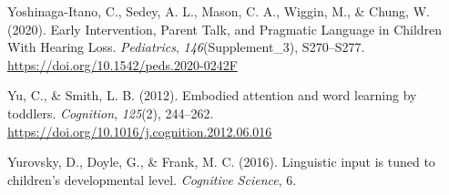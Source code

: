 \documentclass[
  man,floatsintext]{apa6}
\newlength{\cslhangindent}
\newlength{\cslentryspacingunit} %
\newenvironment{CSLReferences}[2] %
 {%
  \setlength{\parindent}{0pt}
  \ifodd #1
  \let\oldpar\par
  \def\par{\hangindent=\cslhangindent\oldpar}
  \fi
  \setlength{\parskip}{#2\cslentryspacingunit}
 }%
 {}
\begin{document}
\begin{CSLReferences}{1}{0}
\leavevmode{}%
Yoshinaga-Itano, C., Sedey, A. L., Mason, C. A., Wiggin, M., \& Chung, W. (2020). Early {Intervention}, {Parent Talk}, and {Pragmatic Language} in {Children With Hearing Loss}. \emph{Pediatrics}, \emph{146}(Supplement\_3), S270--S277. \url{https://doi.org/10.1542/peds.2020-0242F}

\leavevmode{}%
Yu, C., \& Smith, L. B. (2012). Embodied attention and word learning by toddlers. \emph{Cognition}, \emph{125}(2), 244--262. \url{https://doi.org/10.1016/j.cognition.2012.06.016}

\leavevmode{}%
Yurovsky, D., Doyle, G., \& Frank, M. C. (2016). Linguistic input is tuned to children's developmental level. \emph{Cognitive Science}, 6.

\end{CSLReferences}
\end{document}
